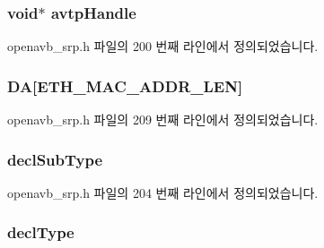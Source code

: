 \subsubsection[{\texorpdfstring{avtp\+Handle}{avtpHandle}}]{\setlength{\rightskip}{0pt plus 5cm}void$\ast$ avtp\+Handle}\hypertarget{structopenavb_srp_strm_a4b9351eb0c3d027b65d2babae355d2c1}{}\label{structopenavb_srp_strm_a4b9351eb0c3d027b65d2babae355d2c1}


openavb\+\_\+srp.\+h 파일의 200 번째 라인에서 정의되었습니다.

\subsubsection[{\texorpdfstring{DA}{DA}}]{ DA\mbox{[}{\bf E\+T\+H\+\_\+\+M\+A\+C\+\_\+\+A\+D\+D\+R\+\_\+\+L\+EN}\mbox{]}}\hypertarget{structopenavb_srp_strm_a4b06cae76504947bf16ff5e19c96dbe5}{}\label{structopenavb_srp_strm_a4b06cae76504947bf16ff5e19c96dbe5}


openavb\+\_\+srp.\+h 파일의 209 번째 라인에서 정의되었습니다.

\subsubsection[{\texorpdfstring{decl\+Sub\+Type}{declSubType}}]{ decl\+Sub\+Type}\hypertarget{structopenavb_srp_strm_abc93f9f17a3050ab69dabfc1ead7109f}{}\label{structopenavb_srp_strm_abc93f9f17a3050ab69dabfc1ead7109f}


openavb\+\_\+srp.\+h 파일의 204 번째 라인에서 정의되었습니다.

\subsubsection[{\texorpdfstring{decl\+Type}{declType}}]{ decl\+Type}\hypertarget{structopenavb_srp_strm_a23ebfbe769e77222f962d8ac98cef81e}{}\label{structopenavb_srp_strm_a23ebfbe769e77222f962d8ac98cef81e}



